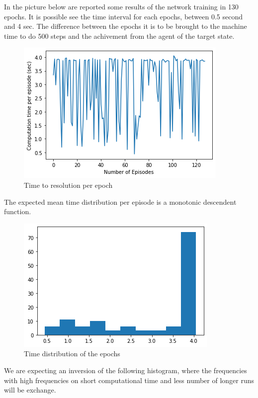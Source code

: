 In the picture below are reported some results of the network training in 130 epochs. It is possible see the time interval for each epochs, between 0.5 second and 4 sec. The difference between the epochs it is to be brought to the machine time to do 500 steps and the achivement from the agent of the target state.

\begin{figure}[h]
    \centering
   \includegraphics[width=\linewidth]{img/epochVStime}
    \caption{Time to resolution per epoch}
    \label{fig:my_label}
\end{figure}
The expected mean time distribution per episode is a monotonic descendent function. 
\begin{figure}[h]
    \centering
    \includegraphics[width=\linewidth]{img/histTimeEps.png}
    \caption{Time distribution of the epochs}
    \label{fig:my_label}
\end{figure}
We are expecting an inversion of the following histogram, where the frequencies with high frequencies on short computational time and less number of longer runs will be exchange. 

